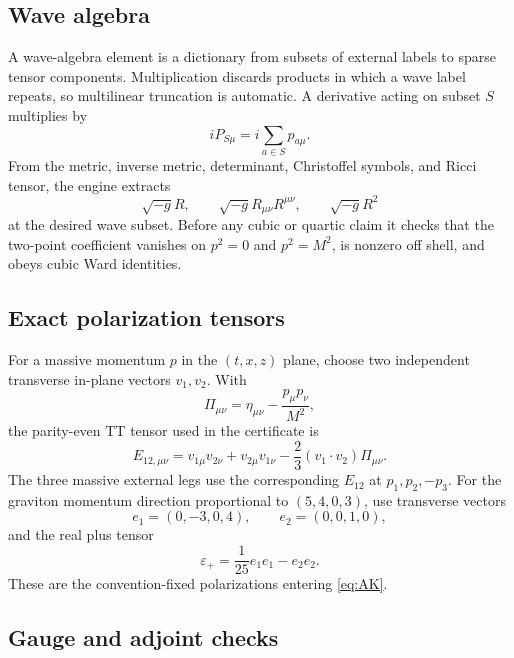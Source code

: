 \documentclass[11pt]{article}
\theoremstyle{definition}
\theoremstyle{remark}
\begin{document}
\subsection{Wave algebra}

A wave-algebra element is a dictionary from subsets of external labels
to sparse tensor components.  Multiplication discards products in which
a wave label repeats, so multilinear truncation is automatic.  A
derivative acting on subset $S$ multiplies by
\begin{equation}
iP_{S\mu}=i\sum_{a\in S}p_{a\mu}.
\end{equation}
From the metric, inverse metric, determinant, Christoffel symbols, and
Ricci tensor, the engine extracts
\begin{equation}
\sqrt{-g}R,\qquad
\sqrt{-g}R_{\mu\nu}R^{\mu\nu},
\qquad
\sqrt{-g}R^2
\end{equation}
at the desired wave subset.  Before any cubic or quartic claim it checks
that the two-point coefficient vanishes on $p^2=0$ and $p^2=M^2$, is
nonzero off shell, and obeys cubic Ward identities.

\subsection{Exact polarization tensors}

For a massive momentum $p$ in the $(t,x,z)$ plane, choose two independent
transverse in-plane vectors $v_1,v_2$.  With
\begin{equation}
\Pi_{\mu\nu}=\eta_{\mu\nu}-\frac{p_\mu p_\nu}{M^2},
\end{equation}
the parity-even TT tensor used in the certificate is
\begin{equation}
E_{12,\mu\nu}=v_{1\mu}v_{2\nu}+v_{2\mu}v_{1\nu}
-\frac23(v_1\cdot v_2)\Pi_{\mu\nu}.
\end{equation}
The three massive external legs use the corresponding $E_{12}$ at
$p_1,p_2,-p_3$.  For the graviton momentum direction proportional to
$(5,4,0,3)$, use transverse vectors
\begin{equation}
e_1=(0,-3,0,4),\qquad e_2=(0,0,1,0),
\end{equation}
and the real plus tensor
\begin{equation}
\varepsilon_+=\frac1{25}e_1e_1-e_2e_2.
\end{equation}
These are the convention-fixed polarizations entering \eqref{eq:AK}.

\subsection{Gauge and adjoint checks}
\end{document}
